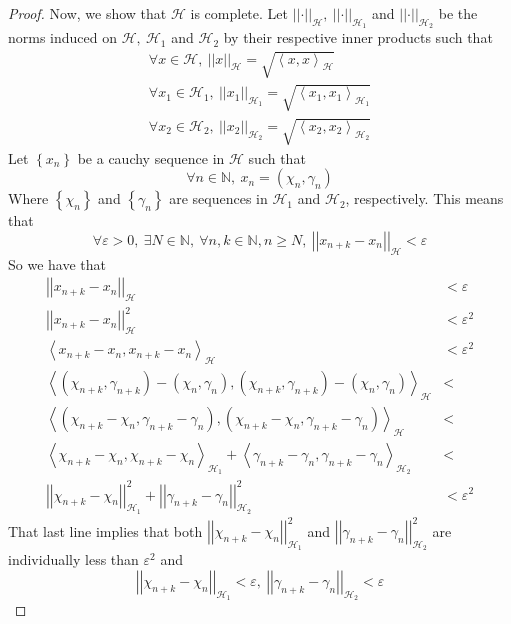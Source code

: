 \documentclass{article}
\newcommand{\norm}[1]{\left|\left|#1\right|\right|}
\newcommand{\bracks}[1]{\left\{#1\right\}}
\newcommand{\vep}{\varepsilon}
\newcommand{\N}{\mathbb{N}}
\newcommand{\hilbert}{\mathcal{H}}
\newcommand{\abracks}[1]{\left< #1\right>}
\begin{document}
\begin{proof}
        Now, we show that $\hilbert$ is complete. Let $\norm{\cdot}_\hilbert,\ 
        \norm{\cdot}_{\hilbert_1}$ and $\norm{\cdot}_{\hilbert_2}$  
        be the norms induced on $\hilbert,\ \hilbert_1$ and $\hilbert_2$ by their respective 
        inner products such that
        \begin{gather*}
        \forall x \in \hilbert,\ \norm{x}_\hilbert = \sqrt{\abracks{x,x}_\hilbert} \\
        \forall x_1 \in \hilbert_1,\ \norm{x_1}_{\hilbert_1} = 
        \sqrt{\abracks{x_1,x_1}_{\hilbert_1}} \\
        \forall x_2 \in \hilbert_2,\ \norm{x_2}_{\hilbert_2} = 
        \sqrt{\abracks{x_2,x_2}_{\hilbert_2}}
        \end{gather*}
        Let $\bracks{x_n}$ be a cauchy sequence in $\hilbert$ such that 
        $$\forall n \in \N,\ x_n = (\chi_n, \gamma_n)$$
        Where $\bracks{\chi_n}$ and $\bracks{\gamma_n}$ are sequences in 
        $\hilbert_1$ and $\hilbert_2$, respectively. This means that
        $$\forall \vep > 0,\ \exists N \in \N,\ \forall n,k \in \N, n \geq N,\ 
        \norm{x_{n+k} - x_n}_\hilbert < \vep$$
        So we have that 
        \begin{align*}
        \norm{x_{n+k} - x_n}_\hilbert &< \vep \\
        \norm{x_{n+k} - x_n}_\hilbert^2 &< \vep^2 \\
        \abracks{x_{n+k} - x_n, x_{n+k} - x_n}_\hilbert &< \vep^2 \\
        \abracks{(\chi_{n+k},\gamma_{n+k}) - (\chi_n, \gamma_n), 
        (\chi_{n+k},\gamma_{n+k}) - (\chi_n, \gamma_n)}_\hilbert &< \\
        \abracks{(\chi_{n+k}-\chi_n,\gamma_{n+k} - \gamma_n), 
        (\chi_{n+k} - \chi_n,\gamma_{n+k} -\gamma_n)}_\hilbert &< \\
        \abracks{\chi_{n+k} - \chi_n, \chi_{n+k} - \chi_n}_{\hilbert_1} +  
        \abracks{\gamma_{n+k} - \gamma_n, \gamma_{n+k} - \gamma_n}_{\hilbert_2} &< \\
        \norm{\chi_{n+k}- \chi_n}_{\hilbert_1}^2 + \norm{\gamma_{n+k}- \gamma_n}_{\hilbert_2}^2
        &< \vep^2
        \end{align*}
        That last line implies that both $\norm{\chi_{n+k}- \chi_n}_{\hilbert_1}^2$ and  
        $\norm{\gamma_{n+k}- \gamma_n}_{\hilbert_2}^2$ are individually less than $\vep^2$
        and 
        $$\norm{\chi_{n+k}- \chi_n}_{\hilbert_1} < \vep,\  
        \norm{\gamma_{n+k}- \gamma_n}_{\hilbert_2} < \vep$$

\end{proof}
\end{document}
